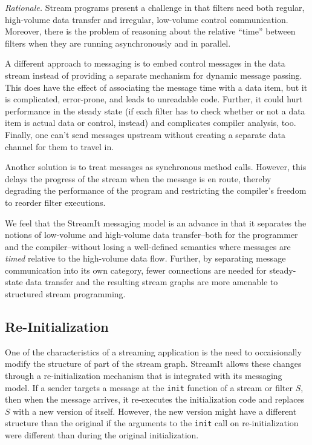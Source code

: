 \emph{Rationale.}  Stream programs present a challenge in that filters
need both regular, high-volume data transfer and irregular, low-volume
control communication.  Moreover, there is the problem of reasoning
about the relative ``time'' between filters when they are running
asynchronously and in parallel.

A different approach to messaging is to embed control messages in the
data stream instead of providing a separate mechanism for dynamic
message passing.  This does have the effect of associating the message
time with a data item, but it is complicated, error-prone, and leads
to unreadable code.  Further, it could hurt performance in the steady
state (if each filter has to check whether or not a data item is
actual data or control, instead) and complicates compiler analysis,
too.  Finally, one can't send messages upstream without creating a
separate data channel for them to travel in.

Another solution is to treat messages as synchronous method calls.
However, this delays the progress of the stream when the message is en
route, thereby degrading the performance of the program and
restricting the compiler's freedom to reorder filter executions.  

We feel that the StreamIt messaging model is an advance in that it
separates the notions of low-volume and high-volume data transfer--both
for the programmer and the compiler--without losing a well-defined
semantics where messages are \emph{timed} relative to the high-volume
data flow.  Further, by separating message communication into its own
category, fewer connections are needed for steady-state data transfer
and the resulting stream graphs are more amenable to structured stream
programming.

\subsection{Re-Initialization}
\label{sec:reinit}

One of the characteristics of a streaming application is the need to
occaisionally modify the structure of part of the stream graph.
StreamIt allows these changes through a re-initialization mechanism
that is integrated with its messaging model.  If a sender targets a
message at the \texttt{init} function of a stream or filter $S$, then
when the message arrives, it re-executes the initialization code and
replaces $S$ with a new version of itself.  However, the new version
might have a different structure than the original if the arguments to
the \texttt{init} call on re-initialization were different than during
the original initialization.


